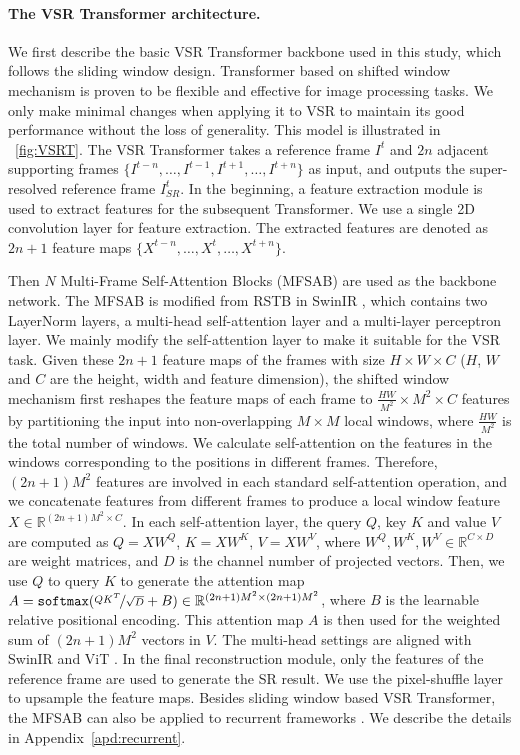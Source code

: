 \documentclass{article}
\begin{document}
\paragraph{The VSR Transformer architecture.}
\label{sec:architecture}
We first describe the basic VSR Transformer backbone used in this study, which follows the sliding window design.
Transformer based on shifted window mechanism \cite{liang2021swinir} is proven to be flexible and effective for image processing tasks.
We only make minimal changes when applying it to VSR to maintain its good performance without the loss of generality. 
This model is illustrated in \figurename~\ref{fig:VSRT}.
The VSR Transformer takes a reference frame $I^{t}$ and $2n$ adjacent supporting frames $\{I^{t-n},\dots,I^{t-1},I^{t+1},\dots,I^{t+n}\}$ as input, and outputs the super-resolved reference frame $I^{t}_{SR}$.
In the beginning, a feature extraction module is used to extract features for the subsequent Transformer.
We use a single 2D convolution layer for feature extraction.
The extracted features are denoted as $2n+1$ feature maps $\{X^{t-n},\dots,X^{t},\dots,X^{t+n}\}$.



Then $N$ Multi-Frame Self-Attention Blocks (MFSAB) are used as the backbone network.
The MFSAB is modified from RSTB in SwinIR \cite{liang2021swinir}, which contains two LayerNorm \cite{ba2016layer} layers, a multi-head self-attention layer and a multi-layer perceptron layer.
We mainly modify the self-attention layer to make it suitable for the VSR task.
Given these $2n+1$ feature maps of the frames with size $H\times W\times C$ ($H$, $W$ and $C$ are the height, width and feature dimension), the shifted window mechanism first reshapes the feature maps of each frame to $\frac{HW}{M^2}\times M^2\times C$ features by partitioning the input into non-overlapping $M\times M$ local windows, where $\frac{HW}{M^2}$ is the total number of windows.
We calculate self-attention on the features in the windows corresponding to the positions in different frames.
Therefore, $(2n+1)M^2$ features are involved in each standard self-attention operation, and we concatenate features from different frames to produce a local window feature $X\in\mathbb{R}^{(2n+1)M^2\times C}$.
In each self-attention layer, the query $Q$, key $K$ and value $V$ are computed as $Q= XW^{Q}$, $K=XW^{K}$, $V=XW^{V}$, where $W^{Q},W^{K},W^{V}\in\mathbb{R}^{C\times D}$ are weight matrices, and $D$ is the channel number of projected vectors.
Then, we use $Q$ to query $K$ to generate the attention map $A=\mathtt{softmax}( \nicefrac{QK^T}{\sqrt{D}}+ B)\in\mathbb{R}^{(2n+1)M^2\times(2n+1)M^2}$, where $B$ is the learnable relative positional encoding.
This attention map $A$ is then used for the weighted sum of $(2n+1)M^2$ vectors in $V$.
The multi-head settings are aligned with SwinIR \cite{liang2021swinir} and ViT \cite{dosovitskiy2020image}.
In the final reconstruction module, only the features of the reference frame are used to generate the SR result.
We use the pixel-shuffle layer \cite{shi2016real} to upsample the feature maps.
Besides sliding window based VSR Transformer, the MFSAB can also be applied to recurrent frameworks \cite{chan2021basicvsr++}.
We describe the details in Appendix~\ref{apd:recurrent}.
\end{document}
